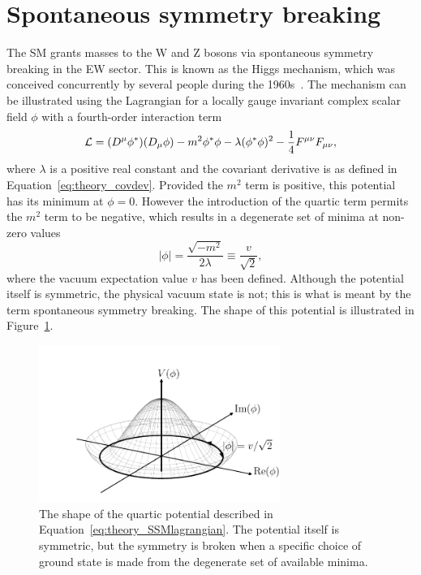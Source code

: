 \section{Spontaneous symmetry breaking}

The SM grants masses to the W and Z bosons via spontaneous symmetry breaking 
in the EW sector.
This is known as the Higgs mechanism, 
which was conceived concurrently by several people 
during the 1960s~\cite{HiggsPaper,BroutEnglert,KibbleEtc}.
The mechanism can be illustrated using the Lagrangian 
for a locally gauge invariant complex scalar field $\phi$ 
with a fourth-order interaction term~\cite{Thomson}
\begin{equation}
\label{eq:theory_SSMlagrangian}
\mathcal{L} = (D^\mu \phi^*) (D_\mu \phi) - m^2 \phi^*\phi 
        - \lambda (\phi^*\phi)^2 - \frac{1}{4} F^{\mu\nu}F_{\mu\nu} ,
\end{equation}
where $\lambda$ is a positive real constant %
and the covariant derivative is as defined in Equation~\ref{eq:theory_covdev}.
Provided the $m^2$ term is positive, this potential has its minimum at $\phi=0$.
However the introduction of the quartic term permits the $m^2$ term to be negative, 
which results in a degenerate set of minima at non-zero values
\begin{equation}
|\phi| = \frac{\sqrt{-m^2}}{2\lambda} \equiv \frac{v}{\sqrt{2}} ,
\end{equation}
where the vacuum expectation value $v$ has been defined.
Although the potential itself is symmetric, the physical vacuum state is not;
this is what is meant by the term spontaneous symmetry breaking.
The shape of this potential is illustrated in Figure~\ref{fig:theory_SSB}.

\begin{figure}[hptb]
  \centering
  \includegraphics[width=0.7\textwidth]{Figures/Theory/SSB.pdf}
  \caption[Quartic potential exhibiting spontaneous symmetry breaking.]
  {
    The shape of the quartic potential described in Equation~\ref{eq:theory_SSMlagrangian}.
    The potential itself is symmetric, 
    but the symmetry is broken when a specific choice of ground state is made 
    from the degenerate set of available minima.
  }
  \label{fig:theory_SSB}
\end{figure}

